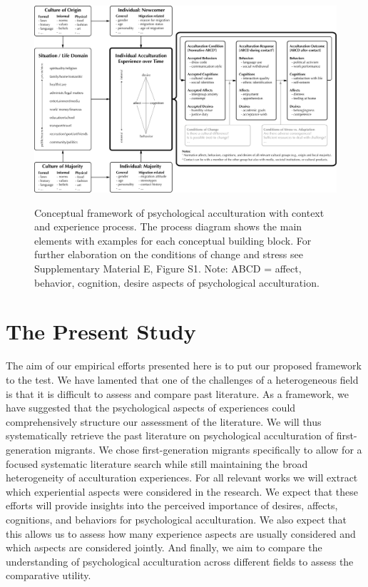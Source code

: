 \documentclass[man, 12pt, a4paper, mask]{apa7}
\newcommand\Warning[1][2ex]{%
  \renewcommand\stacktype{L}%
  \scaleto{\stackon[1.3pt]{\color{red}$\triangle$}{\tiny\bfseries !}}{#1}}%
\begin{document}
\begin{figure}
    \centering
    \caption{Conceptual framework of psychological acculturation with context and experience process. The process diagram shows the main elements with examples for each conceptual building block. For further elaboration on the conditions of change and stress see Supplementary Material E, Figure S1. Note: ABCD = affect, behavior, cognition, desire aspects of psychological acculturation.}
    \includegraphics[width=\textwidth]{Figures/ConceptualFrameworkExpandedOptima_short.pdf}
    \label{fig:ModelContext}
\end{figure}

\section{The Present Study}


The aim of our empirical efforts presented here is to put our proposed framework to the test. We have lamented that one of the challenges of a heterogeneous field is that it is difficult to assess and compare past literature. As a framework, we have suggested that the psychological aspects of experiences could comprehensively structure our assessment of the literature. We will thus systematically retrieve the past literature on psychological acculturation of first-generation migrants. We chose first-generation migrants specifically to allow for a focused systematic literature search while still maintaining the broad heterogeneity of acculturation experiences. For all relevant works we will extract which experiential aspects were considered in the research. We expect that these efforts will provide insights into the perceived importance of desires, affects, cognitions, and behaviors for psychological acculturation. We also expect that this allows us to assess how many experience aspects are usually considered and which aspects are considered jointly. And finally, we aim to compare the understanding of psychological acculturation across different fields to assess the comparative utility. 
\end{document}
